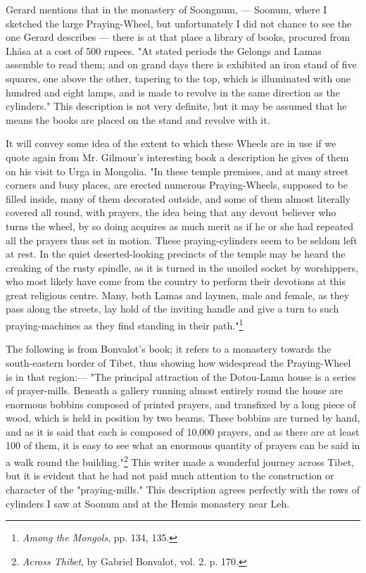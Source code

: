 \documentclass[a4paper, 11pt, oneside, polutonikogreek, english]{article}
\begin{document}
Gerard mentions that in the monastery of Soongnum, --- Soonum, where I sketched the large Praying-Wheel, but unfortunately I did not chance to see the one Gerard describes --- there is at that place a library of books, procured from Lhása at a cost of 500 rupees. "At stated periods the Gelongs and Lamas assemble to read them; and on grand days there is exhibited an iron stand of five squares, one above the other, tapering to the top, which is illuminated with one hundred and eight lamps, and is made to revolve in the same direction as the cylinders." This description is not very definite, but it may be assumed that he means the books are placed on the stand and revolve with it.

It will convey some idea of the extent to which these Wheels are in use if we quote again from Mr. Gilmour's interesting book a description he gives of them on his visit to Urga in Mongolia. "In these temple premises, and at many street corners and busy places, are erected numerous Praying-Wheels, supposed to be filled inside, many of them decorated outside, and some of them almost literally covered all round, with prayers, the idea being that any devout believer who turns the wheel, by so doing acquires as much merit as if he or she had repeated all the prayers thus set in motion. These praying-cylinders seem to be seldom left at rest. In the quiet deserted-looking precincts of the temple may be heard the creaking of the rusty spindle, as it is turned in the unoiled socket by worshippers, who most likely have come from the country to perform their devotions at this great religious centre. Many, both Lamas and laymen, male and female, as they pass along the streets, lay hold of the inviting handle and give a turn to such praying-machines as they find standing in their path."\footnote{\emph{Among the Mongols}, pp. 134, 135.}

The following is from Bonvalot's book; it refers to a monastery towards the south-eastern border of Tibet, thus showing how widespread the Praying-Wheel is in that region:--- "The principal attraction of the Dotou-Lama house is a series of prayer-mills. Beneath a gallery running almost entirely round the house are enormous bobbins composed of printed prayers, and transfixed by a long piece of wood, which is held in position by two beams. These bobbins are turned by hand, and as it is said that each is composed of 10,000 prayers, and as there are at least 100 of them, it is easy to see what an enormous quantity of prayers can be said in a walk round the building."\footnote{\emph{Across Thibet}, by Gabriel Bonvalot, vol. 2. p. 170.} This writer made a wonderful journey across Tibet, but it is evident that he had not paid much attention to the construction or character of the "praying-mills." This description agrees perfectly with the rows of cylinders I saw at Soonum and at the Hemis monastery near Leh.
\end{document}
